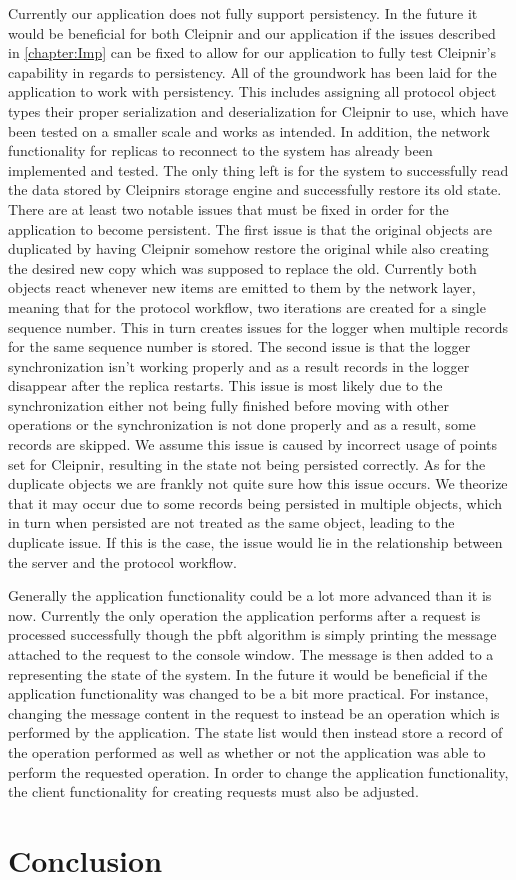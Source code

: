 Currently our application does not fully support persistency. In the future it would be beneficial for both Cleipnir and our application if the issues described in \autoref{chapter:Imp} can be fixed to allow for our application to fully test Cleipnir's capability in regards to persistency. All of the groundwork has been laid for the application to work with persistency. This includes assigning all protocol object types their proper serialization and deserialization for Cleipnir to use, which have been tested on a smaller scale and works as intended. In addition, the network functionality for replicas to reconnect to the system has already been implemented and tested. The only thing left is for the system to successfully read the data stored by Cleipnirs storage engine and successfully restore its old state.
There are at least two notable issues that must be fixed in order for the application to become persistent. The first issue is that the original  objects are duplicated by having Cleipnir somehow restore the original  while also creating the desired new copy which was supposed to replace the old. Currently both  objects react whenever new items are emitted to them by the network layer, meaning that for the protocol workflow, two iterations are created for a single sequence number. This in turn creates issues for the logger when multiple records for the same sequence number is stored. The second issue is that the logger synchronization isn't working properly and as a result records in the logger disappear after the replica restarts. This issue is most likely due to the synchronization either not being fully finished before moving with other operations or the synchronization is not done properly and as a result, some records are skipped. We assume this issue is caused by incorrect usage of  points set for Cleipnir, resulting in the state not being persisted correctly. As for the duplicate  objects we are frankly not quite sure how this issue occurs. We theorize that it may occur due to some records being persisted in multiple objects, which in turn when persisted are not treated as the same  object, leading to the duplicate issue. If this is the case, the issue would lie in the relationship between the server and the protocol workflow.

Generally the application functionality could be a lot more advanced than it is now. Currently the only operation the application performs after a request is processed successfully though the \ac{pbft} algorithm is simply printing the message attached to the request to the console window. The message is then added to a  representing the state of the system. In the future it would be beneficial if the application functionality was changed to be a bit more practical. For instance, changing the message content in the request to instead be an operation which is performed by the application. The state list would then instead store a record of the operation performed as well as whether or not the application was able to perform the requested operation. In order to change the application functionality, the client functionality for creating requests must also be adjusted.

\section{Conclusion}

